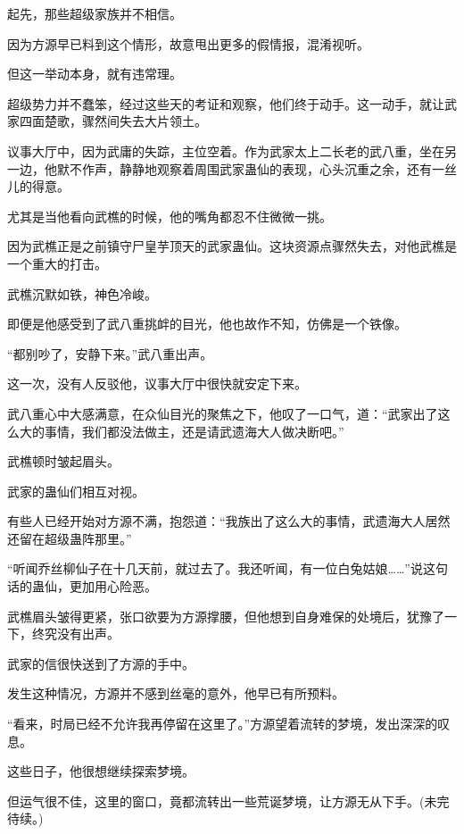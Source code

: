 \begin{this_body}
起先，那些超级家族并不相信。

因为方源早已料到这个情形，故意甩出更多的假情报，混淆视听。

但这一举动本身，就有违常理。

超级势力并不蠢笨，经过这些天的考证和观察，他们终于动手。这一动手，就让武家四面楚歌，骤然间失去大片领土。

议事大厅中，因为武庸的失踪，主位空着。作为武家太上二长老的武八重，坐在另一边，他默不作声，静静地观察着周围武家蛊仙的表现，心头沉重之余，还有一丝儿的得意。

尤其是当他看向武樵的时候，他的嘴角都忍不住微微一挑。

因为武樵正是之前镇守尸皇芋顶天的武家蛊仙。这块资源点骤然失去，对他武樵是一个重大的打击。

武樵沉默如铁，神色冷峻。

即便是他感受到了武八重挑衅的目光，他也故作不知，仿佛是一个铁像。

“都别吵了，安静下来。”武八重出声。

这一次，没有人反驳他，议事大厅中很快就安定下来。

武八重心中大感满意，在众仙目光的聚焦之下，他叹了一口气，道：“武家出了这么大的事情，我们都没法做主，还是请武遗海大人做决断吧。”

武樵顿时皱起眉头。

武家的蛊仙们相互对视。

有些人已经开始对方源不满，抱怨道：“我族出了这么大的事情，武遗海大人居然还留在超级蛊阵那里。”

“听闻乔丝柳仙子在十几天前，就过去了。我还听闻，有一位白兔姑娘……”说这句话的蛊仙，更加用心险恶。

武樵眉头皱得更紧，张口欲要为方源撑腰，但他想到自身难保的处境后，犹豫了一下，终究没有出声。

武家的信很快送到了方源的手中。

发生这种情况，方源并不感到丝毫的意外，他早已有所预料。

“看来，时局已经不允许我再停留在这里了。”方源望着流转的梦境，发出深深的叹息。

这些日子，他很想继续探索梦境。

但运气很不佳，这里的窗口，竟都流转出一些荒诞梦境，让方源无从下手。(未完待续。)

\end{this_body}


